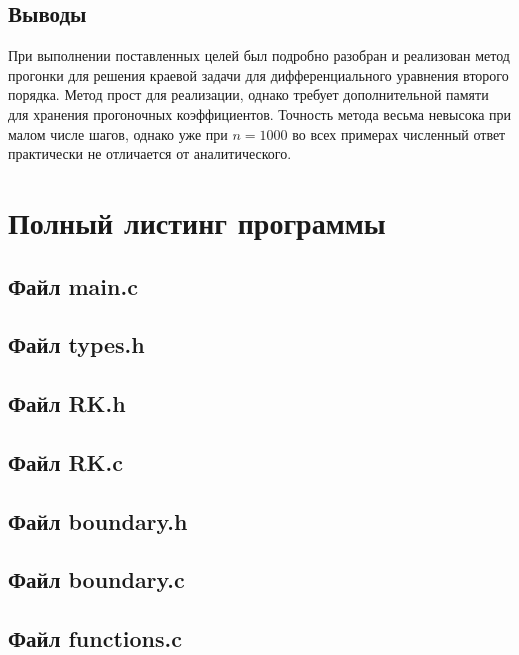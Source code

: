 \documentclass[a4paper,12pt,titlepage,finall]{article}
\begin{document}
\subsection{Выводы}
При выполнении поставленных целей был подробно разобран и реализован метод прогонки для решения краевой задачи для дифференциального уравнения второго порядка. Метод прост для реализации, однако требует дополнительной памяти для хранения прогоночных коэффициентов. Точность метода весьма невысока при малом числе шагов, однако уже при $n = 1000$ во всех примерах численный ответ практически не отличается от аналитического.

\newpage
\section{Полный листинг программы} \label{source}
\subsection{Файл main.c}

\subsection{Файл types.h}

\subsection{Файл RK.h}

\subsection{Файл RK.c}

\subsection{Файл boundary.h}

\subsection{Файл boundary.c}

\subsection{Файл functions.c}

\end{document}
